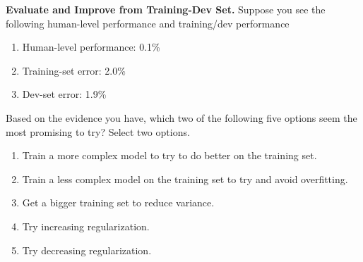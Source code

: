 \item{}
\textbf{Evaluate and Improve from Training-Dev Set.}
Suppose you see the following human-level performance and training/dev performance
\begin{enumerate}
    \item Human-level performance: 0.1\%
    \item Training-set error: 2.0\%
    \item Dev-set error: 1.9\%
\end{enumerate}

Based on the evidence you have, which two of the following five options seem the most promising to try? Select two options.	

\begin{enumerate}[label=(\alph*)]
    \item Train a more complex model to try to do better on the training set.
    \item Train a less complex model on the training set to try and avoid overfitting.
    \item Get a bigger training set to reduce variance.
    \item Try increasing regularization.
    \item Try decreasing regularization.
\end{enumerate} 
